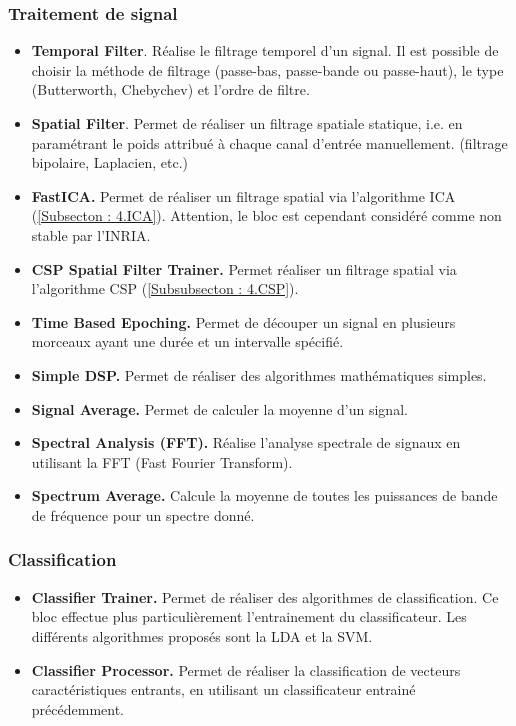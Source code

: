 \subsubsection{Traitement de signal}
\label{Subsubsection : 5.Traitement de signal}
\begin{itemize}
	\smallbreak
	\item \textbf{Temporal Filter}. Réalise le filtrage temporel d'un signal. Il est possible de choisir la méthode de filtrage (passe-bas, passe-bande ou passe-haut), le type (Butterworth, Chebychev) et l'ordre de filtre.
	\smallbreak
	\item \textbf{Spatial Filter}. Permet de réaliser un filtrage spatiale statique, i.e. en paramétrant le poids attribué à chaque canal d'entrée manuellement. (filtrage bipolaire, Laplacien, etc.)
	\smallbreak
	\item \textbf{FastICA.} Permet de réaliser un filtrage spatial via l'algorithme ICA (\ref{Subsecton : 4.ICA}). Attention, le bloc est cependant considéré comme non stable par l'INRIA.
	\smallbreak
	\item \textbf{CSP Spatial Filter Trainer.} Permet réaliser un filtrage spatial via l'algorithme CSP (\ref{Subsubsecton : 4.CSP}).
	\smallbreak
	\item  \textbf{Time Based Epoching.} Permet de découper un signal en plusieurs morceaux ayant une durée et un intervalle spécifié.
	\smallbreak
	\item \textbf{Simple DSP.} Permet de réaliser des algorithmes mathématiques simples.
	\smallbreak
	\item \textbf{Signal Average.} Permet de calculer la moyenne d'un signal.
	\smallbreak
	\item \textbf{Spectral Analysis (FFT).} Réalise l'analyse spectrale de signaux en utilisant la FFT (Fast Fourier Transform).
	\smallbreak
	\item \textbf{ Spectrum Average.} Calcule la moyenne de toutes les puissances de bande de fréquence pour un spectre donné.
\end{itemize}
\subsubsection{Classification}
\label{Subsubsection : 5.Classification}
\begin{itemize}
	\smallbreak
	\item \textbf{Classifier Trainer.} Permet de réaliser des algorithmes de classification. Ce bloc effectue plus particulièrement l'entrainement du classificateur. Les différents algorithmes proposés sont la LDA et la SVM.
	\smallbreak
	\item \textbf{Classifier Processor.} Permet de réaliser la classification de vecteurs  caractéristiques entrants, en utilisant un classificateur entrainé précédemment.
	
\end{itemize}
